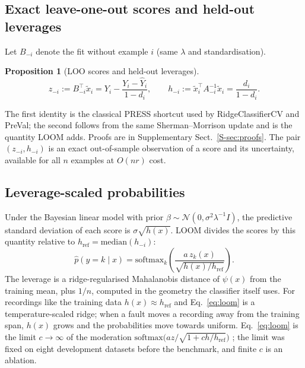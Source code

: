 \documentclass[preprint,12pt,authoryear]{elsarticle}
\newtheorem{proposition}{Proposition}
\begin{document}
\subsection{Exact leave-one-out scores and held-out leverages}
Let $B_{-i}$ denote the fit without example $i$ (same $\lambda$ and standardisation).
\begin{proposition}[LOO scores and held-out leverages]\label{prop:loo}
\begin{equation}\label{eq:loo}
z_{-i}:=B_{-i}^\top\tilde x_i=Y_i-\frac{Y_i-\hat Y_i}{1-d_i},\qquad h_{-i}:=\tilde x_i^\top A_{-i}^{-1}\tilde x_i=\frac{d_i}{1-d_i}.
\end{equation}
\end{proposition}
The first identity is the classical PRESS shortcut \citep{allen1974} used by RidgeClassifierCV and PreVal; the second follows from the same Sherman--Morrison update and is the quantity LOOM adds. Proofs are in Supplementary Sect.~\ref{S-sec:proofs}. The pair $(z_{-i},h_{-i})$ is an exact out-of-sample observation of a score and its uncertainty, available for all $n$ examples at $O(nr)$ cost.

\subsection{Leverage-scaled probabilities}
Under the Bayesian linear model with prior $\beta\sim\mathcal N(0,\sigma^2\lambda^{-1}I)$, the predictive standard deviation of each score is $\sigma\sqrt{h(x)}$. LOOM divides the scores by this quantity relative to $h_{\mathrm{ref}}=\mathrm{median}(h_{-i})$:
\begin{equation}\label{eq:loom}
\hat p(y=k\mid x)=\mathrm{softmax}_k\!\left(\frac{a\,z_k(x)}{\sqrt{h(x)/h_{\mathrm{ref}}}}\right).
\end{equation}
The leverage is a ridge-regularised Mahalanobis distance of $\psi(x)$ from the training mean, plus $1/n$, computed in the geometry the classifier itself uses. For recordings like the training data $h(x)\approx h_{\mathrm{ref}}$ and Eq.~\eqref{eq:loom} is a temperature-scaled ridge; when a fault moves a recording away from the training span, $h(x)$ grows and the probabilities move towards uniform. Eq.~\eqref{eq:loom} is the limit $c\to\infty$ of the moderation $\mathrm{softmax}\big(az/\sqrt{1+ch/h_{\mathrm{ref}}}\big)$ \citep{kristiadi2020,mackay1992}; the limit was fixed on eight development datasets before the benchmark, and finite $c$ is an ablation.
\end{document}
